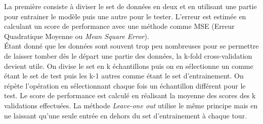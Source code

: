 \noindent La première consiste à diviser le set de données en deux et en utilisant une partie pour entrainer le modèle puis une autre pour le tester. L'erreur est estimée en calculant un score de performance avec une méthode comme MSE (Erreur Quadratique Moyenne ou \textit{Mean Square Error}). \\

\noindent Étant donné que les données sont souvent trop peu nombreuses pour se permettre de laisser tomber dès le départ une partie des données, la k-fold cross-validation devient utile. On divise le set en k échantillons puis on en sélectionne un comme étant le set de test puis les k-1 autres comme étant le set d'entrainement. On répète l'opération en sélectionnant chaque fois un échantillon différent pour le test. Le score de performance est calculé en réalisant la moyenne des scores des k validations effectuées. La méthode \textit{Leave-one out} utilise le même principe mais en ne laissant qu'une seule entrée en dehors du set d'entrainement à chaque tour\cite{hastie_09_elements-of.statistical-learning}. 


